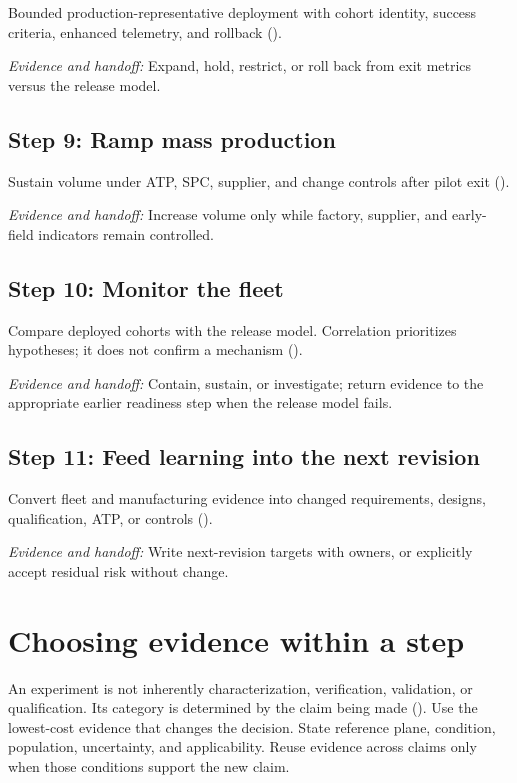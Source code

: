 Bounded production-representative deployment with cohort identity, success
criteria, enhanced telemetry, and rollback
().

\textit{Evidence and handoff:} Expand, hold, restrict, or roll back from exit
metrics versus the release model.

\subsection{Step 9: Ramp mass production}
\label{sec:ladder-mp}

Sustain volume under ATP, SPC, supplier, and change controls after pilot exit
().

\textit{Evidence and handoff:} Increase volume only while factory, supplier, and
early-field indicators remain controlled.

\subsection{Step 10: Monitor the fleet}
\label{sec:ladder-fleet-monitor}

Compare deployed cohorts with the release model. Correlation prioritizes
hypotheses; it does not confirm a mechanism
().

\textit{Evidence and handoff:} Contain, sustain, or investigate; return evidence
to the appropriate earlier readiness step when the release model fails.

\subsection{Step 11: Feed learning into the next revision}
\label{sec:ladder-feedback}

Convert fleet and manufacturing evidence into changed requirements, designs,
qualification, ATP, or controls ().

\textit{Evidence and handoff:} Write next-revision targets with owners, or
explicitly accept residual risk without change.

\section{Choosing evidence within a step}
\label{sec:ladder-evidence-class}

An experiment is not inherently characterization, verification, validation, or
qualification. Its category is determined by the claim being made
(). Use the lowest-cost evidence that changes the
decision. State reference plane, condition, population, uncertainty, and
applicability. Reuse evidence across claims only when those conditions support
the new claim.

